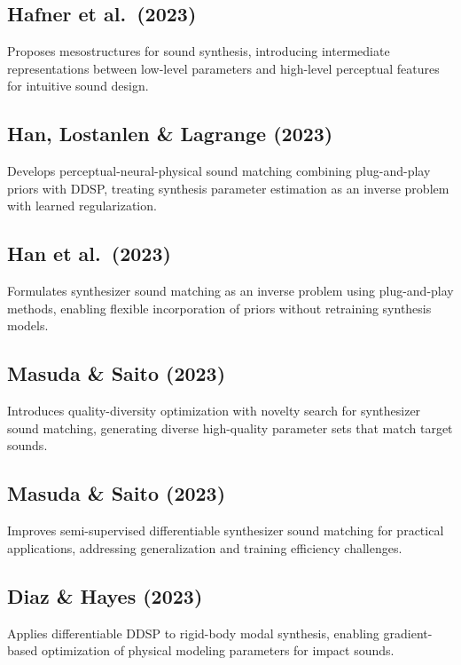 \documentclass[12pt]{article}
\begin{document}
\subsection*{Hafner et al.\ (2023) \cite{Hafner2023}}
Proposes mesostructures for sound synthesis, introducing intermediate representations between low-level parameters and high-level perceptual features for intuitive sound design.

\subsection*{Han, Lostanlen \& Lagrange (2023) \cite{han2023perceptualneuralphysicalsoundmatching}}
Develops perceptual-neural-physical sound matching combining plug-and-play priors with DDSP, treating synthesis parameter estimation as an inverse problem with learned regularization.

\subsection*{Han et al.\ (2023) \cite{HanInverse2023}}
Formulates synthesizer sound matching as an inverse problem using plug-and-play methods, enabling flexible incorporation of priors without retraining synthesis models.

\subsection*{Masuda \& Saito (2023) \cite{MasudaSaito2023}}
Introduces quality-diversity optimization with novelty search for synthesizer sound matching, generating diverse high-quality parameter sets that match target sounds.

\subsection*{Masuda \& Saito (2023) \cite{MasudaSaito2023improved}}
Improves semi-supervised differentiable synthesizer sound matching for practical applications, addressing generalization and training efficiency challenges.

\subsection*{Diaz \& Hayes (2023) \cite{DiazHayes2023}}
Applies differentiable DDSP to rigid-body modal synthesis, enabling gradient-based optimization of physical modeling parameters for impact sounds.
\end{document}
